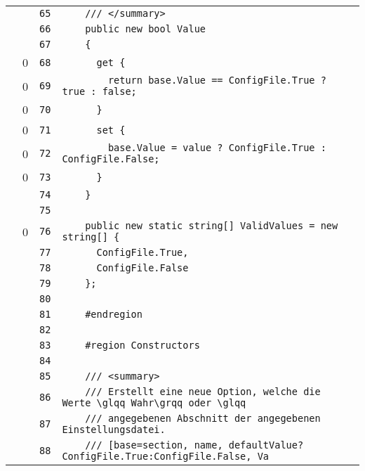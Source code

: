 \documentclass[a4paper,10pt]{article}
\begin{document}
\begin{longtable}[l]{lrrl}
\cellcolor{gray} &  & \verb~65~ & \verb~    /// </summary>~\\
\cellcolor{gray} &  & \verb~66~ & \verb~    public new bool Value~\\
\cellcolor{gray} &  & \verb~67~ & \verb~    {~\\
\cellcolor{red} & 0 & \verb~68~ & \verb~      get {~\\
\cellcolor{red} & 0 & \verb~69~ & \verb~        return base.Value == ConfigFile.True ? true : false;~\\
\cellcolor{red} & 0 & \verb~70~ & \verb~      }~\\
\cellcolor{red} & 0 & \verb~71~ & \verb~      set {~\\
\cellcolor{red} & 0 & \verb~72~ & \verb~        base.Value = value ? ConfigFile.True : ConfigFile.False;~\\
\cellcolor{red} & 0 & \verb~73~ & \verb~      }~\\
\cellcolor{gray} &  & \verb~74~ & \verb~    }~\\
\cellcolor{gray} &  & \verb~75~ & \verb~~\\
\cellcolor{red} & 0 & \verb~76~ & \verb~    public new static string[] ValidValues = new string[] {~\\
\cellcolor{gray} &  & \verb~77~ & \verb~      ConfigFile.True,~\\
\cellcolor{gray} &  & \verb~78~ & \verb~      ConfigFile.False~\\
\cellcolor{gray} &  & \verb~79~ & \verb~    };~\\
\cellcolor{gray} &  & \verb~80~ & \verb~~\\
\cellcolor{gray} &  & \verb~81~ & \verb~    #endregion~\\
\cellcolor{gray} &  & \verb~82~ & \verb~~\\
\cellcolor{gray} &  & \verb~83~ & \verb~    #region Constructors~\\
\cellcolor{gray} &  & \verb~84~ & \verb~~\\
\cellcolor{gray} &  & \verb~85~ & \verb~    /// <summary>~\\
\cellcolor{gray} &  & \verb~86~ & \verb~    /// Erstellt eine neue Option, welche die Werte \glqq Wahr\grqq oder \glqq~\\
\cellcolor{gray} &  & \verb~87~ & \verb~    /// angegebenen Abschnitt der angegebenen Einstellungsdatei.~\\
\cellcolor{gray} &  & \verb~88~ & \verb~    /// [base=section, name, defaultValue?ConfigFile.True:ConfigFile.False, Va~\\

\end{longtable}
\end{document}
